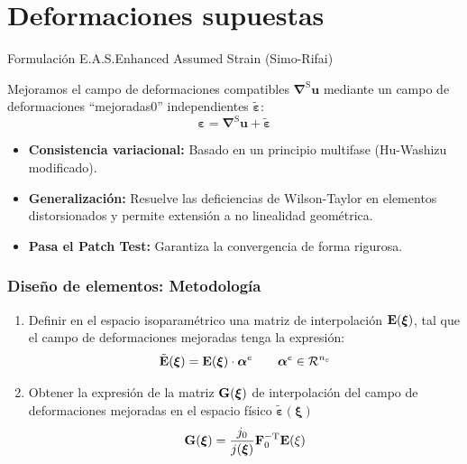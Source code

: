 \documentclass[10pt, aspectratio=43]{beamer}
\begin{document}
\section[E.A.S.]{Deformaciones supuestas}
\begin{frame}{Formulación E.A.S.}{Enhanced Assumed Strain (Simo-Rifai)}
  \begin{uicard}[title=Concepto variacional, top=2pt, bottom=3pt, left=6pt, right=6pt, attach title to upper={\par\vspace{0.05cm}}]
    \small
    Mejoramos el campo de deformaciones compatibles $\bm{\nabla}^{\text{S}}\bm{u}$ mediante un campo de deformaciones ``mejoradas0'' independientes $\tilde{\bm{\varepsilon}}$:
    $$\bm{\varepsilon} = \bm{\nabla}^{\text{S}}\bm{u} + \tilde{\bm{\varepsilon}}$$
  \end{uicard}

  \vspace{0.05cm}

  \begin{uicard}[title=Ventajas de la formulación E.A.S., top=2pt, bottom=3pt, left=6pt, right=6pt, attach title to upper={\par\vspace{0.05cm}}]
    \small
    \begin{itemize}
      \item \textbf{Consistencia variacional:} Basado en un principio multifase (Hu-Washizu modificado).
      \item \textbf{Generalización:} Resuelve las deficiencias de Wilson-Taylor en elementos distorsionados y permite extensión a no linealidad geométrica.
      \item \textbf{Pasa el Patch Test:} Garantiza la convergencia de forma rigurosa.
    \end{itemize}
  \end{uicard}
\end{frame}
\begin{frame}
\frametitle{Diseño de elementos: Metodología}
\begin{enumerate}
\item Definir en el espacio isoparamétrico una matriz de interpolación 
${\bf E}({\bm \xi})$, tal que el campo de deformaciones mejoradas tenga 
la expresión:
$$
{\tilde {\bf E}}({\bm \xi})={\bf E}({\bm \xi})\cdot {\bm \alpha}^{e}
\qquad {\bm \alpha}^{e} \in {\cal R}^{n_{\varepsilon}}
$$
\item Obtener la expresión de la matriz ${\bf G}({\bm \xi})$ de interpolación
del campo de deformaciones mejoradas en el espacio físico
${\tilde {\bm \varepsilon}}({\bm \xi})$
$$
{\bf G}({\bm \xi})=\frac{j_{0}}{j({\bm \xi})}{\bf F}_{0}^{-{\rm T}}
{\bf E}({\bf \xi}) 
$$
\end{enumerate}
\end{frame}
\end{document}
